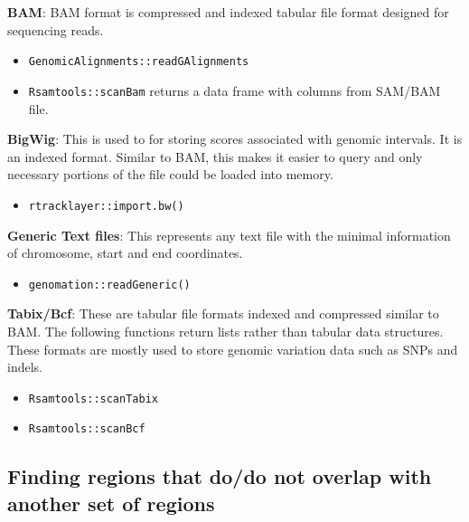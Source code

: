 \documentclass[12pt,]{krantz}
\providecommand{\tightlist}{%
  \setlength{\itemsep}{0pt}\setlength{\parskip}{0pt}}
\begin{document}
\textbf{BAM}: BAM format is compressed and indexed tabular file format designed for sequencing
reads.

\begin{itemize}
\tightlist
\item
  \texttt{GenomicAlignments::readGAlignments}
\item
  \texttt{Rsamtools::scanBam} returns a data frame with columns from SAM/BAM file.
\end{itemize}

\textbf{BigWig}: This is used to for storing scores associated with genomic intervals. It is an indexed format. Similar to BAM, this makes it easier to query and only necessary portions
of the file could be loaded into memory.

\begin{itemize}
\tightlist
\item
  \texttt{rtracklayer::import.bw()}
\end{itemize}

\textbf{Generic Text files}: This represents any text file with the minimal information of chromosome, start and end coordinates.

\begin{itemize}
\tightlist
\item
  \texttt{genomation::readGeneric()}
\end{itemize}

\textbf{Tabix/Bcf}: These are tabular file formats indexed and compressed similar to
BAM. The following functions return lists rather than tabular data structures. These
formats are mostly used to store genomic variation data such as SNPs and indels.

\begin{itemize}
\tightlist
\item
  \texttt{Rsamtools::scanTabix}
\item
  \texttt{Rsamtools::scanBcf}
\end{itemize}

\hypertarget{finding-regions-that-dodo-not-overlap-with-another-set-of-regions}{%
\subsection{Finding regions that do/do not overlap with another set of regions}\label{finding-regions-that-dodo-not-overlap-with-another-set-of-regions}}
\end{document}

